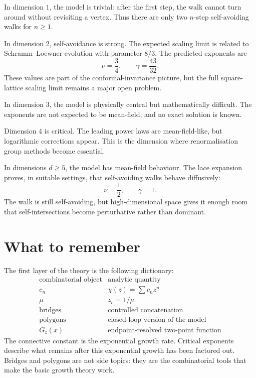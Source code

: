 In dimension \(1\), the model is trivial: after the first step, the walk cannot turn around without revisiting a vertex.  Thus there are only two \(n\)-step self-avoiding walks for \(n\ge1\).

In dimension \(2\), self-avoidance is strong.  The expected scaling limit is related to Schramm--Loewner evolution with parameter \(8/3\).  The predicted exponents are
\[
  \nu=\frac34,
  \qquad
  \gamma=\frac{43}{32}.
\]
These values are part of the conformal-invariance picture, but the full square-lattice scaling limit remains a major open problem.

In dimension \(3\), the model is physically central but mathematically difficult.  The exponents are not expected to be mean-field, and no exact solution is known.

Dimension \(4\) is critical.  The leading power laws are mean-field-like, but logarithmic corrections appear.  This is the dimension where renormalisation group methods become essential.

In dimensions \(d\ge5\), the model has mean-field behaviour.  The lace expansion proves, in suitable settings, that self-avoiding walks behave diffusively:
\[
  \nu=\frac12,
  \qquad
  \gamma=1.
\]
The walk is still self-avoiding, but high-dimensional space gives it enough room that self-intersections become perturbative rather than dominant.

\section{What to remember}

The first layer of the theory is the following dictionary:
\[
\begin{array}{c|c}
\text{combinatorial object} & \text{analytic quantity}\\
\hline
c_n & \chi(z)=\sum c_nz^n\\
\mu & z_c=1/\mu\\
\text{bridges} & \text{controlled concatenation}\\
\text{polygons} & \text{closed-loop version of the model}\\
G_z(x) & \text{endpoint-resolved two-point function}
\end{array}
\]
The connective constant is the exponential growth rate.  Critical exponents describe what remains after this exponential growth has been factored out.  Bridges and polygons are not side topics: they are the combinatorial tools that make the basic growth theory work.
